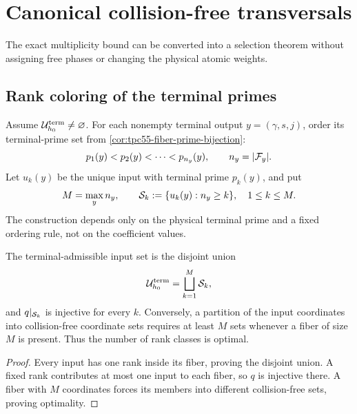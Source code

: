 \section{Canonical collision-free transversals}
\label{sec:transversals}

The exact multiplicity bound can be converted into a selection theorem
without assigning free phases or changing the physical atomic weights.

\subsection{Rank coloring of the terminal primes}

Assume \(\mathcal U_{h_0}^{\rm term}\ne\varnothing\).  For each nonempty terminal
output \(y=(\gamma,s,j)\), order its terminal-prime set
from \cref{cor:tpc55-fiber-prime-bijection}:
\begin{equation}
 p_1(y)<p_2(y)<\cdots<p_{n_y}(y),
 \qquad n_y=|\mathcal F_y|.
 \label{eq:tpc55-prime-order}
\end{equation}
Let \(u_k(y)\) be the unique input with terminal prime \(p_k(y)\), and put
\begin{equation}
 M=\max_y n_y,
 \qquad
 \mathcal S_k:=\{u_k(y):n_y\ge k\},
 \quad 1\le k\le M.
 \label{eq:tpc55-rank-transversals}
\end{equation}
The construction depends only on the physical terminal prime and a fixed
ordering rule, not on the coefficient values.

\begin{theorem}
\label{thm:tpc55-prime-rank-cover}
The terminal-admissible input set is the disjoint union
\begin{equation}
 \mathcal U_{h_0}^{\rm term}
 =\bigsqcup_{k=1}^{M}\mathcal S_k,
 \label{eq:tpc55-rank-partition}
\end{equation}
and \(q|_{\mathcal S_k}\) is injective for every \(k\).  Conversely, a partition
of the input coordinates into collision-free coordinate sets requires at
least \(M\) sets whenever a fiber of size \(M\) is present.  Thus the number
of rank classes is optimal.
\end{theorem}

\begin{proof}
Every input has one rank inside its fiber, proving the disjoint union.  A
fixed rank contributes at most one input to each fiber, so \(q\) is
injective there.  A fiber with \(M\) coordinates forces its members into
different collision-free sets, proving optimality.
\end{proof}

